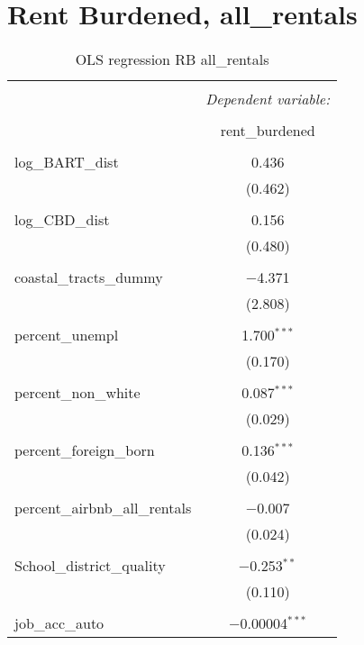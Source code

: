 \documentclass[10pt, letterpaper]{amsart}
\begin{document}
\section{Rent Burdened, all\_rentals}

\begin{table}[H] \centering 
  \caption{OLS regression RB all\_rentals} 
  \label{} 
  \begin{tabular}{@{\extracolsep{5pt}}lc} 
    \\[-1.8ex]\hline 
    \hline \\[-1.8ex] 
    & \multicolumn{1}{c}{\textit{Dependent variable:}} \\ 
    \cline{2-2} 
    \\[-1.8ex] & rent\_burdened \\ 
    \hline \\[-1.8ex] 
    log\_BART\_dist & 0.436 \\ 
    & (0.462) \\ 
    & \\ 
    log\_CBD\_dist & 0.156 \\ 
    & (0.480) \\ 
    & \\ 
    coastal\_tracts\_dummy & $-$4.371 \\ 
    & (2.808) \\ 
    & \\ 
    percent\_unempl & 1.700$^{***}$ \\ 
    & (0.170) \\ 
    & \\ 
    percent\_non\_white & 0.087$^{***}$ \\ 
    & (0.029) \\ 
    & \\ 
    percent\_foreign\_born & 0.136$^{***}$ \\ 
    & (0.042) \\ 
    & \\ 
    percent\_airbnb\_all\_rentals & $-$0.007 \\ 
    & (0.024) \\ 
    & \\ 
    School\_district\_quality & $-$0.253$^{**}$ \\ 
    & (0.110) \\ 
    & \\ 
    job\_acc\_auto & $-$0.00004$^{***}$ \\ 

\end{tabular}
\end{table}
\end{document}
